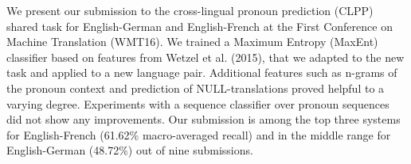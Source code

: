 We present our submission to the cross-lingual pronoun prediction (CLPP) shared task for English-German and English-French at the First Conference on Machine Translation (WMT16). We trained a Maximum Entropy (MaxEnt) classifier based on features from Wetzel et al. (2015), that we adapted to the new task and applied to a new language pair. Additional features such as n-grams of the pronoun context and prediction of NULL-translations proved helpful to a varying degree. Experiments with a sequence classifier over pronoun sequences did not show any improvements. Our submission is among the top three systems for English-French (61.62\% macro-averaged recall) and in the middle range for English-German (48.72\%) out of nine submissions.
